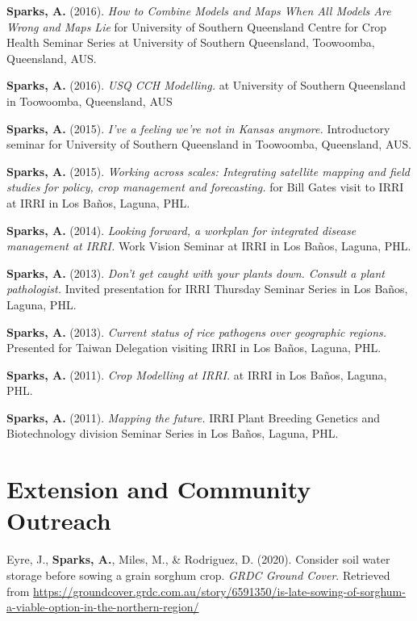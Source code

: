 \documentclass[11pt, a4paper]{awesome-cv}
\begin{document}
\textbf{Sparks, A.} (2016). \emph{How to Combine Models and Maps When
All Models Are Wrong and Maps Lie} for University of Southern Queensland
Centre for Crop Health Seminar Series at University of Southern
Queensland, Toowoomba, Queensland, AUS.

\textbf{Sparks, A.} (2016). \emph{USQ CCH Modelling.} at University of
Southern Queensland in Toowoomba, Queensland, AUS

\textbf{Sparks, A.} (2015). \emph{I've a feeling we're not in Kansas
anymore.} Introductory seminar for University of Southern Queensland in
Toowoomba, Queensland, AUS.

\textbf{Sparks, A.} (2015). \emph{Working across scales: Integrating
satellite mapping and field studies for policy, crop management and
forecasting.} for Bill Gates visit to IRRI at IRRI in Los Baños, Laguna,
PHL.

\textbf{Sparks, A.} (2014). \emph{Looking forward, a workplan for
integrated disease management at IRRI.} Work Vision Seminar at IRRI in
Los Baños, Laguna, PHL.

\textbf{Sparks, A.} (2013). \emph{Don't get caught with your plants
down. Consult a plant pathologist.} Invited presentation for IRRI
Thursday Seminar Series in Los Baños, Laguna, PHL.

\textbf{Sparks, A.} (2013). \emph{Current status of rice pathogens over
geographic regions.} Presented for Taiwan Delegation visiting IRRI in
Los Baños, Laguna, PHL.

\textbf{Sparks, A.} (2011). \emph{Crop Modelling at IRRI.} at IRRI in
Los Baños, Laguna, PHL.

\textbf{Sparks, A.} (2011). \emph{Mapping the future.} IRRI Plant
Breeding Genetics and Biotechnology division Seminar Series in Los
Baños, Laguna, PHL.

\endgroup

\hypertarget{extension-and-community-outreach}{%
\section{Extension and Community
Outreach}\label{extension-and-community-outreach}}

\begingroup
\setlength{\parindent}{-0.5in}
\setlength{\leftskip}{0.5in}

\hypertarget{refs_extension}{}
\leavevmode{}%
Eyre, J., \textbf{Sparks, A.}, Miles, M., \& Rodriguez, D. (2020).
Consider soil water storage before sowing a grain sorghum crop.
\emph{GRDC Ground Cover}. Retrieved from
\url{https://groundcover.grdc.com.au/story/6591350/is-late-sowing-of-sorghum-a-viable-option-in-the-northern-region/}
\end{document}
